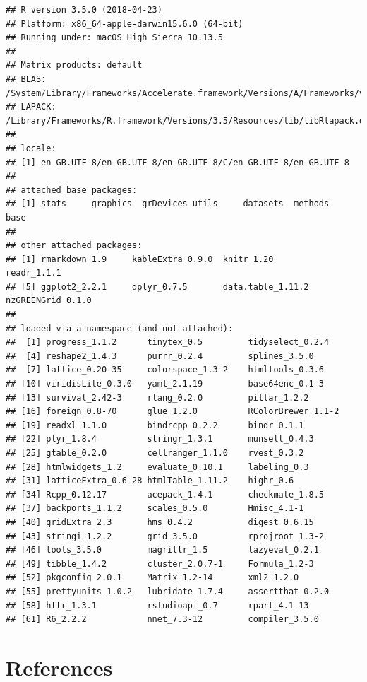 \documentclass[]{article}
\begin{document}
\begin{verbatim}
## R version 3.5.0 (2018-04-23)
## Platform: x86_64-apple-darwin15.6.0 (64-bit)
## Running under: macOS High Sierra 10.13.5
## 
## Matrix products: default
## BLAS: /System/Library/Frameworks/Accelerate.framework/Versions/A/Frameworks/vecLib.framework/Versions/A/libBLAS.dylib
## LAPACK: /Library/Frameworks/R.framework/Versions/3.5/Resources/lib/libRlapack.dylib
## 
## locale:
## [1] en_GB.UTF-8/en_GB.UTF-8/en_GB.UTF-8/C/en_GB.UTF-8/en_GB.UTF-8
## 
## attached base packages:
## [1] stats     graphics  grDevices utils     datasets  methods   base     
## 
## other attached packages:
## [1] rmarkdown_1.9     kableExtra_0.9.0  knitr_1.20        readr_1.1.1      
## [5] ggplot2_2.2.1     dplyr_0.7.5       data.table_1.11.2 nzGREENGrid_0.1.0
## 
## loaded via a namespace (and not attached):
##  [1] progress_1.1.2      tinytex_0.5         tidyselect_0.2.4   
##  [4] reshape2_1.4.3      purrr_0.2.4         splines_3.5.0      
##  [7] lattice_0.20-35     colorspace_1.3-2    htmltools_0.3.6    
## [10] viridisLite_0.3.0   yaml_2.1.19         base64enc_0.1-3    
## [13] survival_2.42-3     rlang_0.2.0         pillar_1.2.2       
## [16] foreign_0.8-70      glue_1.2.0          RColorBrewer_1.1-2 
## [19] readxl_1.1.0        bindrcpp_0.2.2      bindr_0.1.1        
## [22] plyr_1.8.4          stringr_1.3.1       munsell_0.4.3      
## [25] gtable_0.2.0        cellranger_1.1.0    rvest_0.3.2        
## [28] htmlwidgets_1.2     evaluate_0.10.1     labeling_0.3       
## [31] latticeExtra_0.6-28 htmlTable_1.11.2    highr_0.6          
## [34] Rcpp_0.12.17        acepack_1.4.1       checkmate_1.8.5    
## [37] backports_1.1.2     scales_0.5.0        Hmisc_4.1-1        
## [40] gridExtra_2.3       hms_0.4.2           digest_0.6.15      
## [43] stringi_1.2.2       grid_3.5.0          rprojroot_1.3-2    
## [46] tools_3.5.0         magrittr_1.5        lazyeval_0.2.1     
## [49] tibble_1.4.2        cluster_2.0.7-1     Formula_1.2-3      
## [52] pkgconfig_2.0.1     Matrix_1.2-14       xml2_1.2.0         
## [55] prettyunits_1.0.2   lubridate_1.7.4     assertthat_0.2.0   
## [58] httr_1.3.1          rstudioapi_0.7      rpart_4.1-13       
## [61] R6_2.2.2            nnet_7.3-12         compiler_3.5.0
\end{verbatim}

\section*{References}\label{references}
\end{document}

